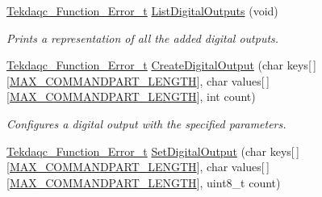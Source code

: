 \begin{DoxyCompactItemize}
\hyperlink{group__tekdaqc__error_ga19df05d919ecca7a7501b35ae9080a32}{Tekdaqc\-\_\-\-Function\-\_\-\-Error\-\_\-t} \hyperlink{group__digital__output_ga3310818e215cffd25126906b9215e46b}{List\-Digital\-Outputs} (void)
\begin{DoxyCompactList}\small\item\em Prints a representation of all the added digital outputs. \end{DoxyCompactList}\item 
\hyperlink{group__tekdaqc__error_ga19df05d919ecca7a7501b35ae9080a32}{Tekdaqc\-\_\-\-Function\-\_\-\-Error\-\_\-t} \hyperlink{group__digital__output_gad98544b3d86d168290b487808e58142f}{Create\-Digital\-Output} (char keys\mbox{[}$\,$\mbox{]}\mbox{[}\hyperlink{group__command__parser_ga6147771b5547853f33eb838895e3d5a2}{M\-A\-X\-\_\-\-C\-O\-M\-M\-A\-N\-D\-P\-A\-R\-T\-\_\-\-L\-E\-N\-G\-T\-H}\mbox{]}, char values\mbox{[}$\,$\mbox{]}\mbox{[}\hyperlink{group__command__parser_ga6147771b5547853f33eb838895e3d5a2}{M\-A\-X\-\_\-\-C\-O\-M\-M\-A\-N\-D\-P\-A\-R\-T\-\_\-\-L\-E\-N\-G\-T\-H}\mbox{]}, int count)
\begin{DoxyCompactList}\small\item\em Configures a digital output with the specified parameters. \end{DoxyCompactList}\item 
\hypertarget{group__digital__output_ga7f6d7f4a8ed42dfa380728cad94dbc28}{\hyperlink{group__tekdaqc__error_ga19df05d919ecca7a7501b35ae9080a32}{Tekdaqc\-\_\-\-Function\-\_\-\-Error\-\_\-t} \hyperlink{group__digital__output_ga7f6d7f4a8ed42dfa380728cad94dbc28}{Set\-Digital\-Output} (char keys\mbox{[}$\,$\mbox{]}\mbox{[}\hyperlink{group__command__parser_ga6147771b5547853f33eb838895e3d5a2}{M\-A\-X\-\_\-\-C\-O\-M\-M\-A\-N\-D\-P\-A\-R\-T\-\_\-\-L\-E\-N\-G\-T\-H}\mbox{]}, char values\mbox{[}$\,$\mbox{]}\mbox{[}\hyperlink{group__command__parser_ga6147771b5547853f33eb838895e3d5a2}{M\-A\-X\-\_\-\-C\-O\-M\-M\-A\-N\-D\-P\-A\-R\-T\-\_\-\-L\-E\-N\-G\-T\-H}\mbox{]}, uint8\-\_\-t count)}\label{group__digital__output_ga7f6d7f4a8ed42dfa380728cad94dbc28}


\end{DoxyCompactItemize}
